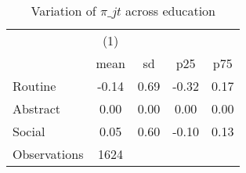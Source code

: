 \begin{table}[htbp]\centering
\def\sym#1{\ifmmode^{#1}\else\(^{#1}\)\fi}
\caption{Variation of $\pi\_{jt}$ across education}
\begin{tabular}{l*{1}{cccc}}
\toprule
                    &\multicolumn{1}{c}{(1)}&            &            &            \\
                    &        mean&          sd&         p25&         p75\\
\midrule
Routine             &       -0.14&        0.69&       -0.32&        0.17\\
Abstract            &        0.00&        0.00&        0.00&        0.00\\
Social              &        0.05&        0.60&       -0.10&        0.13\\
\midrule
Observations        &        1624&            &            &            \\
\bottomrule
\end{tabular}
\end{table}
